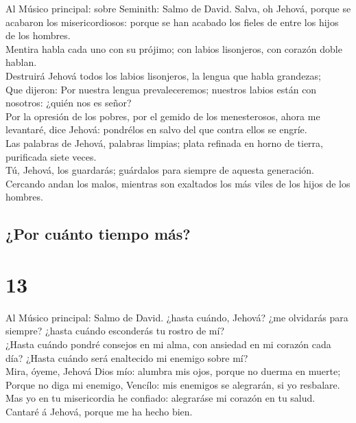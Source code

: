  Al Músico principal: sobre Seminith: Salmo de David.
Salva, oh Jehová, porque se acabaron los misericordiosos: porque se han
acabado los fieles de entre los hijos de los hombres.\\
 Mentira habla cada uno con su prójimo; con labios
lisonjeros, con corazón doble hablan.\\
 Destruirá Jehová todos los labios lisonjeros, la lengua
que habla grandezas;\\
 Que dijeron: Por nuestra lengua prevaleceremos; nuestros
labios están con nosotros: ¿quién nos es señor?\\
 Por la opresión de los pobres, por el gemido de los
menesterosos, ahora me levantaré, dice Jehová: pondrélos en salvo del
que contra ellos se engríe.\\
 Las palabras de Jehová, palabras limpias; plata refinada
en horno de tierra, purificada siete veces.\\
 Tú, Jehová, los guardarás; guárdalos para siempre de
aquesta generación.\\
 Cercando andan los malos, mientras son exaltados los más
viles de los hijos de los hombres.

\hypertarget{por-cuuxe1nto-tiempo-muxe1s}{%
\subsection{¿Por cuánto tiempo más?}\label{por-cuuxe1nto-tiempo-muxe1s}}

\hypertarget{section-19-13}{%
\section{13}\label{section-19-13}}

 Al Músico principal: Salmo de David. ¿hasta cuándo,
Jehová? ¿me olvidarás para siempre? ¿hasta cuándo esconderás tu rostro
de mí?\\
 ¿Hasta cuándo pondré consejos en mi alma, con ansiedad en
mi corazón cada día? ¿Hasta cuándo será enaltecido mi enemigo sobre
mí?\\
 Mira, óyeme, Jehová Dios mío: alumbra mis ojos, porque no
duerma en muerte;\\
 Porque no diga mi enemigo, Vencílo: mis enemigos se
alegrarán, si yo resbalare.\\
 Mas yo en tu misericordia he confiado: alegraráse mi
corazón en tu salud.\\
 Cantaré á Jehová, porque me ha hecho bien.

